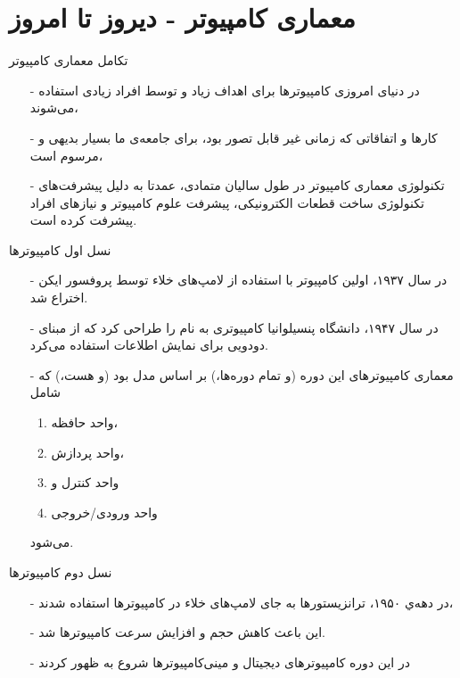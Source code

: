\section{معماری کامپیوتر - دیروز تا امروز}
\begin{frame}{تکامل معماری کامپیوتر}
\begin{itemize}\itemr
\item[-]
در دنیای امروزی کامپیوتر‌ها برای اهداف زیاد و توسط افراد زیادی استفاده می‌شوند،
\item[-]
کارها و اتفاقاتی که زمانی غیر قابل تصور بود، برای جامعه‌ی ما بسیار بدیهی و مرسوم است،
\item[-]
تکنولوژی معماری‌ کامپیوتر در طول سالیان متمادی، عمدتا به دلیل پیشرفت‌های تکنولوژی ساخت قطعات الکترونیکی، پیشرفت علوم کامپیوتر و نیاز‌‌های افراد پیشرفت کرده است.
\end{itemize}
\end{frame}

\begin{frame}{نسل اول کامپیوتر‌ها}
\begin{itemize}\itemr
\item[-]
در سال ۱۹۳۷، اولین کامپیوتر با استفاده از لامپ‌های خلاء توسط پروفسور ایکن اختراع شد.
\item[-]
در سال ۱۹۴۷، دانشگاه پنسیلوانیا کامپیوتری به نام 
را طراحی کرد که از مبنای دودویی برای نمایش اطلاعات استفاده می‌کرد.
\item[-]
معماری کامپیوتر‌های این دوره (و تمام دوره‌ها،) بر اساس مدل 
بود (و هست،) که شامل 
\begin{enumerate}\itemr
\item 
واحد‌ حافظه،
\item 
واحد پردازش، 
\item 
واحد کنترل و
\item 
واحد ورودی/خروجی 
\end{enumerate}
می‌شود.
\end{itemize}
\end{frame}

\begin{frame}{نسل دوم کامپیوتر‌ها}
\begin{itemize}\itemr
\item[-]
در دهه‌ي ۱۹۵۰، ترانزیستور‌ها به جای لامپ‌های خلاء در کامپیوتر‌ها استفاده شدند،
\item[-]
این باعث کاهش حجم و افزایش سرعت کامپیوتر‌ها شد.
\item[-]
در این دوره کامپیوتر‌های دیجیتال و مینی‌کامپیوترها شروع به ظهور کردند
\end{itemize}
\end{frame}

